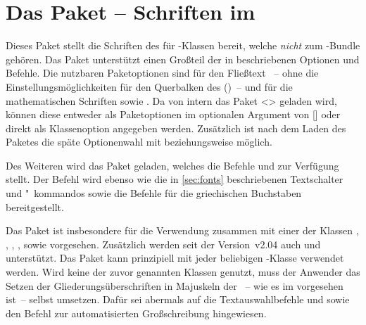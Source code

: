 \begin{Bundle*}{}
\bigskip\noindent
{}%
%
%
\end{Bundle*}



\section{Das Paket  -- Schriften im \CD}
\begin{Bundle*}[v2.02]{}
\printchangedatlist%
%
Dieses Paket stellt die Schriften des \CDs für -Klassen bereit, 
welche \emph{nicht} zum \TUDScript-Bundle gehören. Das Paket unterstützt einen 
Großteil der in  beschriebenen Optionen und Befehle. Die 
nutzbaren Paketoptionen sind für den Fließtext ~-- ohne die 
Einstellungsmöglichkeiten für den Querbalken des \CDs ()~-- und 
für die mathematischen Schriften  sowie . 
Da von  intern das Paket <> geladen 
wird, können diese entweder als Paketoptionen im optionalen Argument von 
[] oder 
direkt als Klassenoption angegeben werden. Zusätzlich ist nach dem Laden des 
Paketes die späte Optionenwahl mit  beziehungsweise 
 möglich.

Des Weiteren wird das Paket  geladen, welches die Befehle 
 und  zur Verfügung stellt. Der 
Befehl  wird ebenso wie die in \autoref{sec:fonts} beschriebenen 
Textschalter und "~kommandos sowie die Befehle für die griechischen Buchstaben 
bereitgestellt.

Das Paket  ist insbesondere für die Verwendung zusammen 
mit einer der Klassen , , , 
,  sowie  vorgesehen. Zusätzlich 
werden seit der Version~v2.04 
auch  und  unterstützt. Das Paket kann 
prinzipiell mit jeder beliebigen -Klasse verwendet werden. Wird 
keine der zuvor genannten Klassen genutzt, muss der Anwender das Setzen der 
Gliederungsüberschriften in Majuskeln der \DIN~-- wie es im \CD vorgesehen 
ist~-- selbst umsetzen. Dafür sei abermals auf die Textauswahlbefehle 
 und  sowie den Befehl  
zur automatisierten Großschreibung hingewiesen.


\end{Bundle*}
